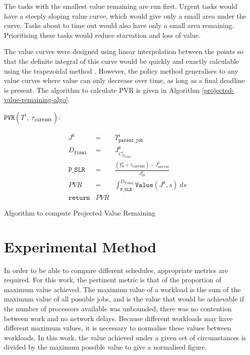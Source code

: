 \documentclass[english,british]{IEEEtran}
\begin{document}
The tasks with the smallest value remaining are run first. Urgent
tasks would have a steeply sloping value curve, which would give only
a small area under the curve. Tasks about to time out would also have
only a small area remaining. Prioritising these tasks would reduce
starvation and loss of value.

The value curves were designed using linear interpolation between
the points so that the definite integral of this curve would be quickly
and exactly calculable using the trapezoidal method \cite{alvarado79}.
However, the policy method generalises to any value curves where value
can only decrease over time, as long as a final deadline is present.
The algorithm to calculate PVR is given in Algorithm \ref{projected-value-remaining-algo}.

\begin{algorithm}
$\mathtt{PVR}\left(T^{i},\:\mathtt{\tau_{current}}\right):$

\begin{eqnarray*}
J^{k} & = & T_{\mathtt{parent\_job}}^{i}\\
D_{\mathtt{final}} & = & J_{C_{D_{\mathtt{final}}}^{i}}^{k}\\
\mathtt{P\_SLR} & = & \frac{\left(T_{\mathtt{R}}^{i}+\tau_{\mathtt{current}}\right)-J_{\mathtt{arrive}}^{k}}{J_{\mathtt{CP}}^{k}}\\
PVR & = & \int_{\mathtt{P\_SLR}}^{D_{\mathtt{final}}}\mathtt{Value}\left(J^{k},s\right)\:ds\\
\mathtt{return} & PVR
\end{eqnarray*}


\protect\caption{Algorithm to compute Projected Value Remaining }


\label{projected-value-remaining-algo}
\end{algorithm}



\section{Experimental Method}

In order to be able to compare different schedules, appropriate metrics
are required. For this work, the pertinent metric is that of the proportion
of maximum value achieved. The maximum value of a workload is the
sum of the maximum value of all possible jobs, and is the value that
would be achievable if the number of processors available was unbounded,
there was no contention between work and no network delays. Because
different workloads may have different maximum values, it is necessary
to normalise these values between workloads. In this work, the value
achieved under a given set of circumstances is divided by the maximum
possible value to give a normalised figure.
\end{document}
